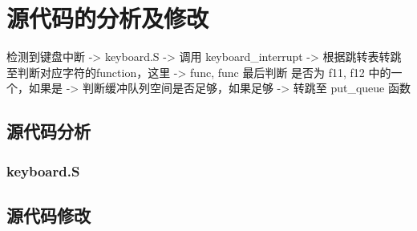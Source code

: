 \section{源代码的分析及修改}
    检测到键盘中断 -> keyboard.S -> 调用 keyboard\_interrupt -> 根据跳转表转跳至判断对应字符的function，这里 -> func, func 最后判断 是否为 f11, f12 中的一个，如果是 -> 判断缓冲队列空间是否足够，如果足够 -> 转跳至 put\_queue 函数
    \subsection{源代码分析}
        \subsubsection{keyboard.S}
            \par 
    \subsection{源代码修改}
        \par 